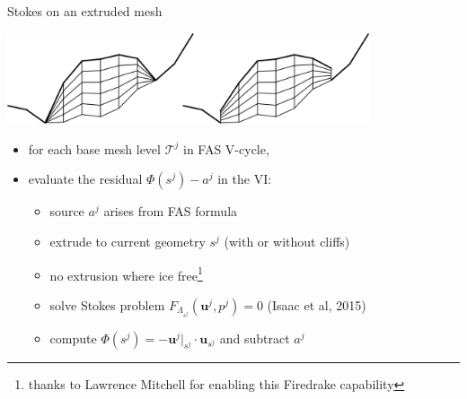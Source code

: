 \documentclass[usepdftitle=false,usenames,dvipsnames]{beamer}
\newcommand{\bu}{\mathbf{u}}
\begin{document}
\begin{frame}{Stokes on an extruded mesh}

\begin{center}
\includegraphics[width=0.8\textwidth]{figs/extruded.png}
\end{center}

\begin{itemize}
\item for each base mesh level $\mathcal{T}^j$ in FAS V-cycle,
\item evaluate the residual $\Phi(s^j) - a^j$ in the VI:
    \begin{itemize}
    \item source $a^j$ arises from FAS formula
    \item extrude to current geometry $s^j$ (with or without cliffs)
    \item no extrusion where ice free\footnote{thanks to Lawrence Mitchell for enabling this Firedrake capability}
    \item solve Stokes problem $F_{\Lambda_{s^j}}(\bu^j,p^j)=0$ (Isaac et al, 2015)
    \item compute $\Phi(s^j) = - \bu^j|_{s^j} \cdot \bu_{s^j}$ and subtract $a^j$
    \end{itemize}
\end{itemize}
\end{frame}
\end{document}
